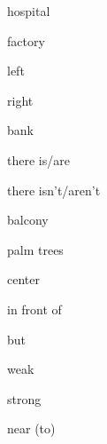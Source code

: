 \begin{flashcard}{\LARGE hospital}
\LARGE {}
\end{flashcard}
\begin{flashcard}{\LARGE factory}
\LARGE {}
\end{flashcard}
\begin{flashcard}{\LARGE left}
\LARGE {}
\end{flashcard}
\begin{flashcard}{\LARGE right}
\LARGE {}
\end{flashcard}
\begin{flashcard}{\LARGE bank}
\LARGE {}
\end{flashcard}
\begin{flashcard}{\LARGE there is/are}
\LARGE {}
\end{flashcard}
\begin{flashcard}{\LARGE there isn't/aren't}
\LARGE {}
\end{flashcard}
\begin{flashcard}{\LARGE balcony}
\LARGE {}
\end{flashcard}
\begin{flashcard}{\LARGE palm trees}
\LARGE {}
\end{flashcard}
\begin{flashcard}{\LARGE center}
\LARGE {}
\end{flashcard}
\begin{flashcard}{\LARGE in front of}
\LARGE {}
\end{flashcard}
\begin{flashcard}{\LARGE but}
\LARGE {}
\end{flashcard}
\begin{flashcard}{\LARGE weak}
\LARGE {}
\end{flashcard}
\begin{flashcard}{\LARGE strong}
\LARGE {}
\end{flashcard}
\begin{flashcard}{\LARGE near (to)}
\LARGE {}
\end{flashcard}
